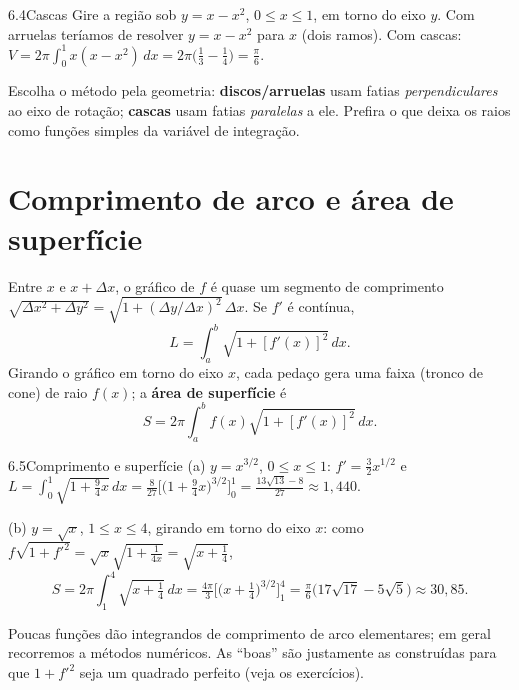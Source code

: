 \begin{exemplo}{6.4}{Cascas}
Gire a região sob $y=x-x^2$, $0\le x\le1$, em torno do eixo $y$.
\solucao
Com arruelas teríamos de resolver $y=x-x^2$ para $x$ (dois ramos). Com cascas:
$V=2\pi\int_0^1x(x-x^2)\,dx=2\pi\big(\tfrac13-\tfrac14\big)=\tfrac\pi6$.
\end{exemplo}

\begin{nota}
Escolha o método pela geometria: \textbf{discos/arruelas} usam fatias
\emph{perpendiculares} ao eixo de rotação; \textbf{cascas} usam fatias \emph{paralelas} a
ele. Prefira o que deixa os raios como funções simples da variável de integração.
\end{nota}

\section{Comprimento de arco e área de superfície}

Entre $x$ e $x+\Delta x$, o gráfico de $f$ é quase um segmento de comprimento
$\sqrt{\Delta x^2+\Delta y^2}=\sqrt{1+(\Delta y/\Delta x)^2}\,\Delta x$. Se $f'$ é contínua,
\[
L=\int_a^b\sqrt{1+[f'(x)]^2}\,dx .
\]
Girando o gráfico em torno do eixo $x$, cada pedaço gera uma faixa (tronco de cone) de raio
$f(x)$; a \textbf{área de superfície} é
\[
S=2\pi\int_a^b f(x)\sqrt{1+[f'(x)]^2}\,dx .
\]

\begin{exemplo}{6.5}{Comprimento e superfície}
(a) $y=x^{3/2}$, $0\le x\le1$: $f'=\frac32x^{1/2}$ e
$L=\int_0^1\sqrt{1+\tfrac94x}\,dx=\tfrac8{27}\Big[\big(1+\tfrac94x\big)^{3/2}\Big]_0^1
=\tfrac{13\sqrt{13}-8}{27}\approx1{,}440$.

(b) $y=\sqrt x$, $1\le x\le4$, girando em torno do eixo $x$: como
$f\sqrt{1+f'^2}=\sqrt x\sqrt{1+\frac1{4x}}=\sqrt{x+\tfrac14}$,
\[
S=2\pi\int_1^4\sqrt{x+\tfrac14}\,dx=\tfrac{4\pi}3\Big[\big(x+\tfrac14\big)^{3/2}\Big]_1^4
=\tfrac\pi6\big(17\sqrt{17}-5\sqrt5\big)\approx30{,}85 .
\]
\end{exemplo}

Poucas funções dão integrandos de comprimento de arco elementares; em geral recorremos a
métodos numéricos. As ``boas'' são justamente as construídas para que $1+f'^2$ seja um
quadrado perfeito (veja os exercícios).

